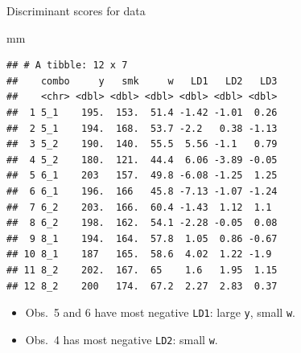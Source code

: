\documentclass[
  ignorenonframetext,
]{beamer}
\newenvironment{Shaded}{\begin{snugshade}}{\end{snugshade}}
\newcommand{\NormalTok}[1]{#1}
\begin{document}
\begin{frame}[fragile]{Discriminant scores for data}
\protect\hypertarget{discriminant-scores-for-data}{}

\footnotesize

\begin{Shaded}
\begin{Highlighting}[]
\NormalTok{mm}
\end{Highlighting}
\end{Shaded}

\begin{verbatim}
## # A tibble: 12 x 7
##    combo     y   smk     w   LD1   LD2   LD3
##    <chr> <dbl> <dbl> <dbl> <dbl> <dbl> <dbl>
##  1 5_1    195.  153.  51.4 -1.42 -1.01  0.26
##  2 5_1    194.  168.  53.7 -2.2   0.38 -1.13
##  3 5_2    190.  140.  55.5  5.56 -1.1   0.79
##  4 5_2    180.  121.  44.4  6.06 -3.89 -0.05
##  5 6_1    203   157.  49.8 -6.08 -1.25  1.25
##  6 6_1    196.  166   45.8 -7.13 -1.07 -1.24
##  7 6_2    203.  166.  60.4 -1.43  1.12  1.1 
##  8 6_2    198.  162.  54.1 -2.28 -0.05  0.08
##  9 8_1    194.  164.  57.8  1.05  0.86 -0.67
## 10 8_1    187   165.  58.6  4.02  1.22 -1.9 
## 11 8_2    202.  167.  65    1.6   1.95  1.15
## 12 8_2    200   174.  67.2  2.27  2.83  0.37
\end{verbatim}

\normalsize

\begin{itemize}
\item
  Obs.~5 and 6 have most negative \texttt{LD1}: large \texttt{y}, small
  \texttt{w}.
\item
  Obs.~4 has most negative \texttt{LD2}: small \texttt{w}.
\end{itemize}

\end{frame}
\end{document}
